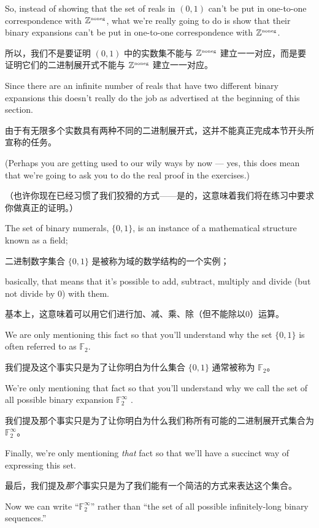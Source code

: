 So, instead of showing that the set of reals in $(0, 1)$ can't be put
in one-to-one
correspondence with ${\mathbb Z}^{\mbox{\tiny noneg}}$, what we're really going to do is show
that their binary expansions can't be put in one-to-one correspondence
with ${\mathbb Z}^{\mbox{\tiny noneg}}$.

所以，我们不是要证明 $(0, 1)$ 中的实数集不能与 ${\mathbb Z}^{\mbox{\tiny noneg}}$ 建立一一对应，而是要证明它们的二进制展开式不能与 ${\mathbb Z}^{\mbox{\tiny noneg}}$ 建立一一对应。

Since
there are an infinite number of reals that have two different binary expansions
this doesn't really do the job as advertised at the beginning of this section.

由于有无限多个实数具有两种不同的二进制展开式，这并不能真正完成本节开头所宣称的任务。

(Perhaps you are getting used to our wily ways by now --- yes, this does
mean that we're going to ask you to do the real proof in the exercises.)

（也许你现在已经习惯了我们狡猾的方式——是的，这意味着我们将在练习中要求你做真正的证明。）

The set of binary numerals, $\{0, 1\}$, is an instance of a mathematical
structure known as a field;

二进制数字集合 $\{0, 1\}$ 是被称为域的数学结构的一个实例；

basically, that means that it's possible to
add, subtract, multiply and divide (but not divide by 0) with them.

基本上，这意味着可以用它们进行加、减、乘、除（但不能除以0）运算。

We are only mentioning this fact so that you'll understand why the set
$\{0, 1\}$ is often referred to as ${\mathbb F}_2$.

我们提及这个事实只是为了让你明白为什么集合 $\{0, 1\}$ 通常被称为 ${\mathbb F}_2$。

We're only mentioning that
fact so that you'll understand why we call the set of all possible
binary expansion ${\mathbb F}_2^\infty$ .

我们提及那个事实只是为了让你明白为什么我们称所有可能的二进制展开式集合为 ${\mathbb F}_2^\infty$。

Finally, we're only mentioning \emph{that}
fact so that we'll have a succinct way of expressing this set.

最后，我们提及\emph{那个}事实只是为了我们能有一个简洁的方式来表达这个集合。

Now we can write ``${\mathbb F}_2^\infty$'' rather than
``the set of all possible infinitely-long binary sequences.''

